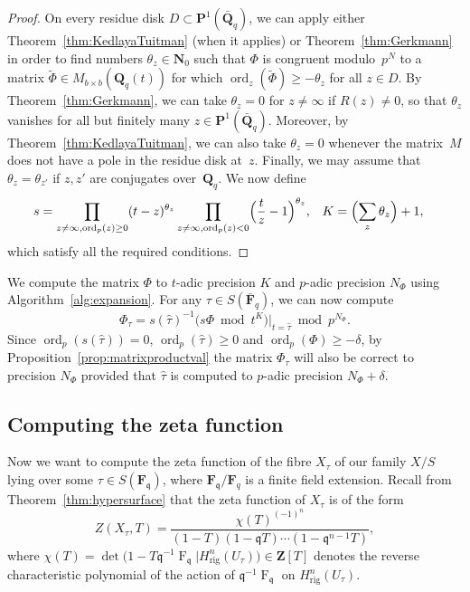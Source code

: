 \documentclass[a4paper,11pt]{article}
\numberwithin{equation}{section}
\newcommand{\NN}{\mathbf{N}} %
\newcommand{\ZZ}{\mathbf{Z}} %
\newcommand{\QQ}{\mathbf{Q}} %
\newcommand{\FF}{\mathbf{F}} %
\DeclareMathOperator{\ord}{ord}          %
\DeclareMathOperator{\Frob}{F}           %
\providecommand{\Hrig}{H_{\text{rig}}}  %
\theoremstyle{definition}
\begin{document}
\begin{proof}
On every residue disk $D \subset \mathbf{P}^1(\bar{\QQ}_q)$, we can 
apply either Theorem~\ref{thm:KedlayaTuitman} (when it applies) or 
Theorem~\ref{thm:Gerkmann} in order to find numbers $\theta_z \in \NN_0$ 
such that $\Phi$ is congruent modulo~$p^N$ to a matrix 
$\tilde{\Phi}\in M_{b \times b}(\QQ_q(t))$ for which $\ord_z(\tilde{\Phi}) \geq -\theta_z$ 
for all $z \in D$. 
By Theorem~\ref{thm:Gerkmann}, we can take $\theta_z=0$ for $z \neq \infty$ if 
$R(z) \neq 0$, so that $\theta_z$ vanishes for all but finitely many $z \in \mathbf{P}^1(\bar{\QQ}_q)$.
Moreover, by Theorem~\ref{thm:KedlayaTuitman}, we can also take $\theta_z=0$ 
whenever the matrix~$M$ does not have a pole in the residue disk at~$z$. 
Finally, we may assume that $\theta_z=\theta_{z'}$ if $z,z'$ are conjugates over~$\QQ_q$.
We now define
\begin{align*}
s &= \prod_{z \neq \infty, \ord_p(z) \geq 0} (t-z)^{\theta_z}
     \prod_{z \neq \infty, \ord_p(z) < 0}\Bigl(\frac{t}{z}-1\Bigr)^{\theta_z}, 
&K&= \Bigl(\sum_{z} \theta_z \Bigr) +1,
\end{align*}
which satisfy all the required conditions.
\end{proof}

We compute the matrix $\Phi$ to $t$-adic precision $K$ and $p$-adic
precision $N_{\Phi}$ using Algorithm~\ref{alg:expansion}. For any 
$\tau \in S(\bar{\FF}_q)$, we can now compute
\begin{equation*}
\Phi_{\tau} = 
  s(\hat{\tau})^{-1} \bigl( s \Phi \bmod{t^{K}} \bigr)|_{t=\hat{\tau}} 
  \bmod{p^{N_{\Phi}}}.
\end{equation*}
Since $\ord_p(s(\hat{\tau}))=0$, $\ord_p(\hat{\tau}) \geq 0$ and
$\ord_p(\Phi) \geq -\delta$, by Proposition~\ref{prop:matrixproductval} 
the matrix $\Phi_{\tau}$ will also be correct to precision $N_{\Phi}$ 
provided that $\hat{\tau}$ is computed to $p$-adic precision $N_{\Phi}+\delta$.

\subsection{Computing the zeta function}

Now we want to compute the zeta function of the fibre $X_{\tau}$ of
our family $X/S$ lying over some $\tau \in S(\FF_{\mathfrak{q}})$, 
where $\FF_{\mathfrak{q}}/\FF_q$ is a finite field extension.  
Recall from Theorem~\ref{thm:hypersurface} 
that the zeta function of $X_{\tau}$ is of the form
\begin{equation*}
Z(X_{\tau},T) = \frac{\chi(T)^{(-1)^n}}{(1 - T) (1 - \mathfrak{q}T) \dotsm (1 - \mathfrak{q}^{n-1}T)},
\end{equation*}
where $\chi(T) = \det \bigl( 1 - T \mathfrak{q}^{-1} \Frob_{\mathfrak{q}} | \Hrig^n(U_{\tau}) \bigr) \in \ZZ[T]$ 
denotes the reverse characteristic polynomial of the action 
of $\mathfrak{q}^{-1} \Frob_{\mathfrak{q}}$ 
on $\Hrig^n(U_{\tau})$.
\end{document}
